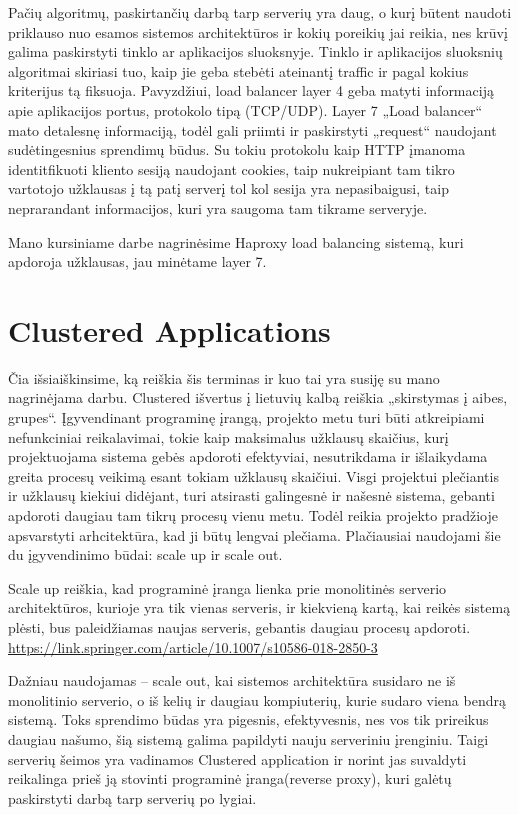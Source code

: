 \documentclass{VUMIFPSkursinis}
\begin{document}
Pačių algoritmų, paskirtančių darbą tarp serverių yra daug, o kurį būtent naudoti priklauso nuo esamos sistemos architektūros ir kokių poreikių jai reikia, nes krūvį galima paskirstyti tinklo ar aplikacijos sluoksnyje. Tinklo ir aplikacijos sluoksnių algoritmai skiriasi tuo, kaip jie geba stebėti ateinantį traffic ir pagal kokius kriterijus tą fiksuoja. Pavyzdžiui, load balancer layer 4 geba matyti informaciją apie aplikacijos portus, protokolo tipą (TCP/UDP). Layer 7 „Load balancer“ mato detalesnę informaciją, todėl gali priimti ir paskirstyti „request“ naudojant sudėtingesnius sprendimų būdus. Su tokiu protokolu kaip HTTP įmanoma identitfikuoti kliento sesiją naudojant cookies, taip nukreipiant tam tikro vartotojo užklausas į tą patį serverį tol kol sesija yra nepasibaigusi, taip neprarandant informacijos, kuri yra saugoma tam tikrame serveryje.
 
Mano kursiniame darbe nagrinėsime Haproxy load balancing sistemą, kuri apdoroja užklausas, jau minėtame layer 7.

\section{Clustered Applications}
	Čia išsiaiškinsime, ką reiškia šis terminas ir kuo tai yra susiję su mano nagrinėjama darbu. Clustered išvertus į lietuvių kalbą reiškia „skirstymas į aibes, grupes“. Įgyvendinant programinę įrangą, projekto metu turi būti atkreipiami nefunkciniai reikalavimai, tokie kaip maksimalus užklausų skaičius, kurį projektuojama sistema gebės apdoroti efektyviai, nesutrikdama ir išlaikydama greita procesų veikimą esant tokiam užklausų skaičiui. Visgi projektui plečiantis ir užklausų kiekiui didėjant, turi atsirasti galingesnė ir našesnė sistema, gebanti apdoroti daugiau tam tikrų procesų vienu metu. Todėl reikia projekto pradžioje apsvarstyti arhcitektūra, kad ji būtų lengvai plečiama. Plačiausiai naudojami šie du įgyvendinimo būdai: scale up ir scale out.

Scale up reiškia, kad programinė įranga lienka prie monolitinės serverio architektūros, kurioje yra tik vienas serveris, ir kiekvieną kartą, kai reikės sistemą plėsti, bus paleidžiamas naujas serveris, gebantis daugiau procesų apdoroti.
\url {https://link.springer.com/article/10.1007/s10586-018-2850-3}

Dažniau naudojamas – scale out, kai sistemos architektūra susidaro ne iš monolitinio serverio, o iš kelių ir daugiau kompiuterių, kurie sudaro viena bendrą sistemą. Toks sprendimo būdas yra pigesnis, efektyvesnis, nes vos tik prireikus daugiau našumo, šią sistemą galima papildyti nauju serveriniu įrenginiu. Taigi serverių šeimos yra vadinamos Clustered application ir norint jas suvaldyti reikalinga prieš ją stovinti programinė įranga(reverse proxy), kuri galėtų paskirstyti darbą tarp serverių po lygiai.
\end{document}
